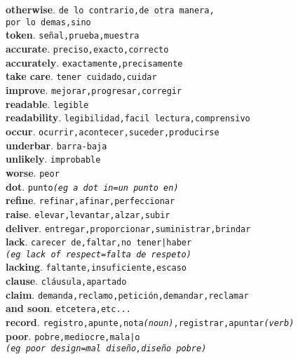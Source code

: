 \documentclass[twocolumn]{article}
\begin{document}
	\textsf{\textbf{otherwise}}. \texttt{de lo contrario,de otra manera,\\por lo demas,sino}\\
	\textsf{\textbf{token}}. \texttt{se\~nal,prueba,muestra}\\
	\textsf{\textbf{accurate}}. \texttt{preciso,exacto,correcto}\\
	\textsf{\textbf{accurately}}. \texttt{exactamente,precisamente}\\
	\textsf{\textbf{take care}}. \texttt{tener cuidado,cuidar}\\
	\textsf{\textbf{improve}}. \texttt{mejorar,progresar,corregir}\\
	\textsf{\textbf{readable}}. \texttt{legible}\\
	\textsf{\textbf{readability}}. \texttt{legibilidad,facil lectura,comprensivo}\\
	\textsf{\textbf{occur}}. \texttt{ocurrir,acontecer,suceder,producirse}\\
	\textsf{\textbf{underbar}}. \texttt{barra-baja}\\
	\textsf{\textbf{unlikely}}. \texttt{improbable}\\
	\textsf{\textbf{worse}}. \texttt{peor}\\
	\textsf{\textbf{dot}}. \texttt{punto{\scriptsize \textsl{(eg a dot in=un punto en)}}}\\
	\textsf{\textbf{refine}}. \texttt{refinar,afinar,perfeccionar}\\
	\textsf{\textbf{raise}}. \texttt{elevar,levantar,alzar,subir}\\
	\textsf{\textbf{deliver}}. \texttt{entregar,proporcionar,suministrar,brindar}\\
	\textsf{\textbf{lack}}. \texttt{carecer de,faltar,no tener|haber\\{\scriptsize \textsl{(eg lack of respect=falta de respeto)}}}\\
	\textsf{\textbf{lacking}}. \texttt{faltante,insuficiente,escaso}\\
	\textsf{\textbf{clause}}. \texttt{cl\'ausula,apartado}\\
	\textsf{\textbf{claim}}. \texttt{demanda,reclamo,petici\'on,demandar,reclamar}\\
	\textsf{\textbf{and soon}}. \texttt{etcetera,etc...}\\
	\textsf{\textbf{record}}. \texttt{registro,apunte,nota{\scriptsize \textsl{(noun)}},registrar,apuntar{\scriptsize \textsl{(verb)}}}\\
	\textsf{\textbf{poor}}. \texttt{pobre,mediocre,mala|o\\{\scriptsize \textsl{(eg poor design=mal dise\~no,dise\~no pobre)}}}\\
\end{document}

